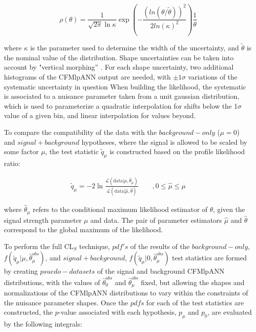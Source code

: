 \begin{equation}
\rho(\theta) = \frac{1}{\sqrt{2\pi}\ln{\kappa}}\exp\left( -
  \frac{(ln(\theta/\tilde{\theta}))^{2}}{2ln(\kappa)^{2}} \right)\frac{1}{\theta}
\end{equation}

\noindent where $\kappa$ is the parameter used to determine the width
of the uncertainty, and $\tilde{\theta}$ is the nominal value of the
distribution.  Shape uncertainties can be taken into account by
"vertical morphing'' \cite{Conway:2011in}.  For each shape
uncertainty, two additional histograms of the CFMlpANN output are needed, with
$\pm1\sigma$ variations of the systematic uncertainty in question
When building the likelihood, the systematic is associated to a
nuisance parameter taken from a unit gaussian distribution, which is 
used to parameterize a quadratic interpolation for shifts below the
1$\sigma$ value of a given bin, and linear interpolation for values beyond. 

\par To compare the compatibility of the data with the
$background-only$ ($\mu=0$) and $signal+background$ hypotheses, where the signal
is allowed to be scaled by some factor $\mu$, the test statistic
$\tilde{q}_{\mu}$ is constructed based on the profile likelihood
ratio: 

\begin{eqnarray}
\tilde{q}_{\mu} =  -2 \ln \frac{\mathcal{L}(\mathrm{data}|\mu,\hat{\theta}_{\mu})}{\mathcal{L}(\mathrm{data}|\hat{\mu},\hat{\theta})} & \quad \ , 0 \le \hat{\mu} \le \mu 
\end{eqnarray}

\noindent where $\hat{\theta}_{\mu}$ refers to the conditional maximum
likelihood estimator of $\theta$, given the signal strength parameter
$\mu$ and data. The pair of parameter estimators $\hat{\mu}$ and
$\hat{\theta}$ correspond to the global maximum of the likelihood.

\par To perform the full CL$_{S}$ technique, $pdf's$ of the results of
the $background-only$, $f(\tilde{q}_{\mu}|\mu,
\hat{\theta}_{\mu}^{obs})$, and $signal+background$,
$f(\tilde{q}_{\mu}|0, \hat{\theta}_{\mu}^{obs})$ test statistics are
formed by creating $psuedo-datasets$ of the signal and background
CFMlpANN distributions, with the values of $\hat{\theta}_{0}^{obs}$
and $\hat{\theta}_{\mu}^{obs}$ fixed, but allowing the shapes and
normalizations of the CFMlpANN distributions to vary within the
constraints of the nuisance parameter shapes.  Once the $pdfs$ for
each of the test statistics are constructed, the $p$-value associated
with each hypothesis, $p_{\mu}$ and $p_{0}$, are evaluated by the
following integrals:

